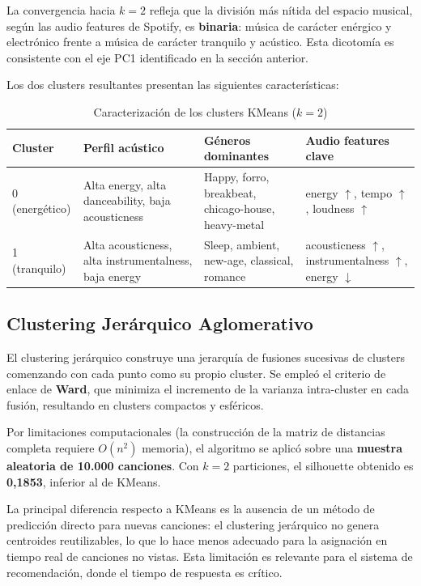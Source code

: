 \documentclass[12pt, a4paper]{book}
\theoremstyle{definition}
\begin{document}
La convergencia hacia $k=2$ refleja que la división más nítida del espacio
musical, según las audio features de Spotify, es \textbf{binaria}: música
de carácter enérgico y electrónico frente a música de carácter tranquilo
y acústico. Esta dicotomía es consistente con el eje PC1 identificado en
la sección anterior.

Los dos clusters resultantes presentan las siguientes características:

\begin{table}[H]
\centering
\caption{Caracterización de los clusters KMeans ($k=2$)}
\label{tab:kmeans_clusters}
\small
\begin{tabular}{lp{3.5cm}p{4cm}p{3.5cm}}
\toprule
\textbf{Cluster} & \textbf{Perfil acústico} & \textbf{Géneros dominantes} & \textbf{Audio features clave} \\
\midrule
0 (energético) & Alta energy, alta danceability, baja acousticness &
  Happy, forro, breakbeat, chicago-house, heavy-metal &
  energy $\uparrow$, tempo $\uparrow$, loudness $\uparrow$ \\
1 (tranquilo) & Alta acousticness, alta instrumentalness, baja energy &
  Sleep, ambient, new-age, classical, romance &
  acousticness $\uparrow$, instrumentalness $\uparrow$, energy $\downarrow$ \\
\bottomrule
\end{tabular}
\end{table}

\subsection{Clustering Jerárquico Aglomerativo}
\label{sec:jerarquico}

El clustering jerárquico construye una jerarquía de fusiones sucesivas de
clusters comenzando con cada punto como su propio cluster. Se empleó el
criterio de enlace de \textbf{Ward}, que minimiza el incremento de la varianza
intra-cluster en cada fusión, resultando en clusters compactos y esféricos.

Por limitaciones computacionales (la construcción de la matriz de distancias
completa requiere $O(n^2)$ memoria), el algoritmo se aplicó sobre una
\textbf{muestra aleatoria de 10.000 canciones}. Con $k=2$ particiones, el
silhouette obtenido es \textbf{0{,}1853}, inferior al de KMeans.

La principal diferencia respecto a KMeans es la ausencia de un método de
predicción directo para nuevas canciones: el clustering jerárquico no genera
centroides reutilizables, lo que lo hace menos adecuado para la asignación
en tiempo real de canciones no vistas. Esta limitación es relevante para el
sistema de recomendación, donde el tiempo de respuesta es crítico.
\end{document}
